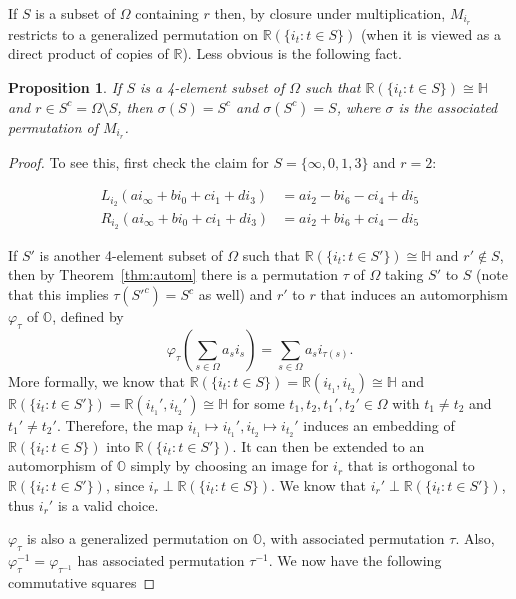 \documentclass[10pt]{amsart}
\newcommand{\R}{\mathbb{R}}
\renewcommand{\H}{\mathbb{H}}
\renewcommand{\O}{\mathbb{O}}
\newtheorem{prop}[thm]{Proposition}
\begin{document}
If $S$ is a subset of $\Omega$ containing $r$ then, by closure under multiplication, $M_{i_r}$ restricts to a generalized permutation on $\R(\{i_t : t \in S\})$ (when it is viewed as a direct product of copies of $\R$).  Less obvious is the following fact.

\begin{prop} \label{prop:genperm}
\normalfont
If $S$ is a 4-element subset of $\Omega$ such that $\R(\{i_t : t \in S\}) \cong \H$ and $r \in S^c = \Omega \setminus S$, then $\sigma(S) = S^c$ and $\sigma(S^c) = S$, where $\sigma$ is the associated permutation of $M_{i_r}$.
\end{prop}

\begin{proof}
To see this, first check the claim for $S = \{ \infty, 0, 1, 3\}$ and $r = 2$:

\begin{align*}
L_{i_2}(a i_\infty +  b i_0 + c i_1 + d i_3) &= ai_2 - bi_6 - ci_4 + d i_5 \\
R_{i_2}(a i_\infty +  b i_0 + c i_1 + d i_3) &= ai_2 + bi_6 + ci_4 - d i_5
\end{align*}

If $S'$ is another 4-element subset of $\Omega$ such that $\R(\{i_t : t \in S'\}) \cong \H$ and $r' \not \in S$, then by Theorem~\ref{thm:autom} there is a permutation $\tau$ of $\Omega$ taking $S'$ to $S$ (note that this implies $\tau(S'^c) = S^c$ as well) and $r'$ to $r$ that induces an automorphism $\varphi_{\tau}$ of $\O$, defined by
$$
\varphi_{\tau}\left( \sum\limits_{s \in \Omega} a_s i_s \right) = \sum\limits_{s \in \Omega} a_s i_{\tau(s)}.
$$
More formally, we know that $\R(\{i_t : t \in S\}) = \R(i_{t_1}, i_{t_2}) \cong \H$ and $\R(\{i_t : t \in S'\}) = \R(i_{t_1}', i_{t_2}') \cong \H$ for some $t_1,t_2,t_1',t_2' \in \Omega$ with $t_1 \neq t_2$ and $t_1' \neq t_2'$.  Therefore, the map $i_{t_1} \mapsto i_{t_1}', i_{t_2} \mapsto i_{t_2}'$ induces an embedding of $\R(\{i_t : t \in S\})$ into $\R(\{i_t : t \in S'\})$.  It can then be extended to an automorphism of $\O$ simply by choosing an image for $i_r$ that is orthogonal to $\R(\{i_t : t \in S'\})$, since $i_r \perp \R(\{i_t : t \in S\})$.  We know that $i_r' \perp \R(\{i_t : t \in S'\})$, thus $i_r'$ is a valid choice.

$\varphi_{\tau}$ is also a generalized permutation on $\O$, with associated permutation $\tau$.  Also, $\varphi_{\tau}^{-1} = \varphi_{\tau^{-1}}$ has associated permutation $\tau^{-1}$.
We now have the following commutative squares


\end{proof}
\end{document}
